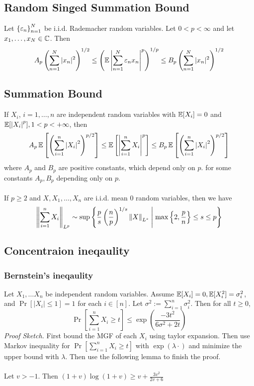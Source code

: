 \documentclass[10pt]{article}
\begin{document}
\subsection{Random Singed Summation Bound} 
  Let $\left\{ \varepsilon_n \right\}_{n=1}^N$ be i.i.d. Rademacher random variables. Let $0 < p < \infty$ and let $x_1, \dots, x_N \in \mathbb{C}$. Then 
\begin{equation}
    A_p \left( \sum_{n=1}^N |x_n|^2 \right)^{1/2} \leq \left( \mathop{\mathbb{E} \displaystyle} \left| \sum_{n=1}^N \varepsilon_n x_n\right|^p \right)^{1/p} \leq B_p \left( \sum_{n=1}^N |x_n|^2 \right)^{1/2}
\end{equation}
\subsection{Summation Bound} 
  If $X_i$, $i=1, \dots, n$ are independent random variables with $\mathop{\mathbb{E} \displaystyle}[X_i] = 0$ and $\mathop{\mathbb{E} \displaystyle}[\left|X_i\right|^p], 1< p < +\infty$, then 
\begin{equation}
    A_p \mathop{\mathbb{E} \displaystyle} \left[ \left( \sum_{i=1}^n \left|X_i\right|^2 \right)^{p/2}\right] \leq \mathop{\mathbb{E} \displaystyle} \left[ \left|\sum_{i=1}^n X_i \right|^p \right] \leq B_p \mathop{\mathbb{E} \displaystyle} \left[ \left( \sum_{i=1}^n \left|X_i\right|^2 \right)^{p/2} \right]
\end{equation}
where $A_p$ and $B_p$ are positive constants, which depend only on $p$.  
for some constants $A_p, B_p$ depending only on $p$. 
\\~\\
 If $p \geq 2$ and $X, X_1, \dots, X_n$ are i.i.d. mean $0$ random variables, then we have
\begin{equation}
    \norm{\sum_{i=1}^n X_i}_{L^p} \sim \sup \set{\frac{p}{s} \left(\frac{n}{p}\right)^{1/s} \norm{X}_{L^s} \given \max \set{2, \frac{p}{n}} \leq s \leq p}
\end{equation}
\subsection{Concentraion ineqaulity}
\subsubsection{Bernstein's ineqaulity}
Let $X_1, \dots X_n$ be independent random variables. Assume $\mathop{\mathbb{E} \displaystyle}[X_i] = 0, \mathop{\mathbb{E} \displaystyle}[X_i^2] = \sigma_i^2$, and $\Pr [ |X_i| \leq 1] = 1$ for each $i \in [n]$. Let $\sigma^2 :=\sum_{i=1}^n \sigma_i^2$. Then for all $t \geq 0$, 
\begin{equation}
    \Pr \left[ \sum_{i=1}^n X_i \geq t \right] \leq \exp \left( \frac{-3t^2}{6 \sigma^2 + 2t} \right) 
\end{equation}
\emph{Proof Sketch.} First bound the MGF of each $X_i$ using taylor expansion. Then use Markov inequality for $\Pr \left[ \sum_{i=1}^n X_i \geq t \right]$ with $\exp(\lambda \cdot)$ and minimize the upper bound with $\lambda$. Then use the following lemma to finish the proof. \\~\\
 Let $v > -1$. Then $(1+v) \log (1+v) \geq v + \frac{3v^2}{2v+6}$ \\ 
\end{document}

